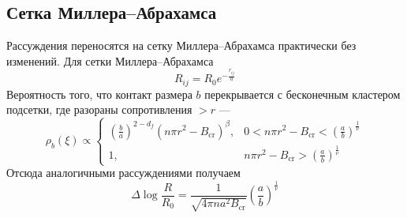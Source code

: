 \documentclass{article}
\begin{document}
\subsection{Сетка Миллера--Абрахамса}
Рассуждения переносятся на сетку Миллера--Абрахамса практически без изменений. Для сетки 
Миллера--Абрахамса
\begin{equation}
    R_{ij} = R_0 e^{-\frac{r_{ij}}{a}}
\end{equation}
Вероятность того, что контакт размера $b$ перекрывается с бесконечным кластером подсетки,
где разораны сопротивления $> r$ ---
\begin{equation}
    \rho_b(\xi) \propto \left\{ 
                 \begin{matrix}   
                 \left(\frac{b}{a}\right)^{2 - d_f}(n\pi r^2 - B_{\mathrm{cr}})^\beta, & 
                       0 < n\pi r^2 - B_{\mathrm{cr}} < 
                                    \left( \frac{a}{b}\right)^{\frac{1}{\nu}}\\
                  1, & n\pi r^2 - B_{\mathrm{cr}} > \left( \frac{a}{b}\right)^{\frac{1}{\nu}}
                 \end{matrix} \right.
\end{equation}
Отсюда аналогичными рассуждениями получаем
\begin{equation}
    \Delta \log{\frac{R}{R_0}} = \frac{1}{\sqrt{4\pi na^2 B_\mathrm{cr}}}
                                    \left( \frac{a}{b}\right)^{\frac{1}{\nu}}
\end{equation}
\end{document}
